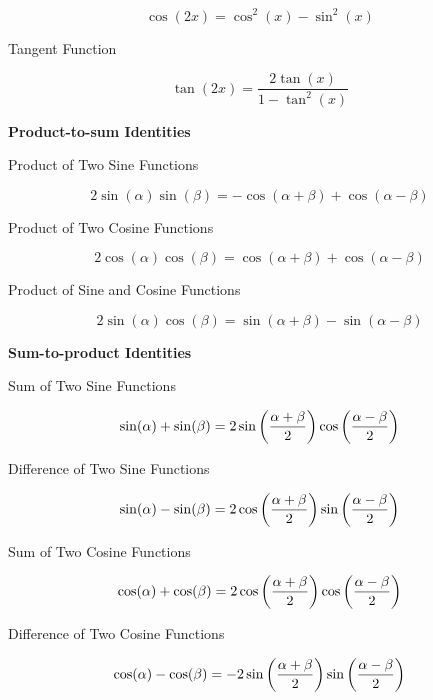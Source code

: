\documentclass[a4paper,12pt]{article}
\begin{document}
\begin{pst}
\begin{alist}
\begin{rlist}
      $$\cos(2x)=\cos^{2}(x)-\sin^{2}(x)$$

      \item Tangent Function

      $$\tan(2x)=\frac{2\tan(x)}{1-\tan^{2}(x)}$$
    \end{rlist}

    \item \textbf{Product-to-sum Identities}

    \begin{rlist}
      \item Product of Two Sine Functions

      $$2\sin(\alpha)\sin(\beta)=-\cos(\alpha+\beta)+\cos(\alpha-\beta)$$

      \item Product of Two Cosine Functions

      $$2\cos(\alpha)\cos(\beta)=\cos(\alpha+\beta)+\cos(\alpha-\beta)$$

      \item Product of Sine and Cosine Functions

      $$2\sin(\alpha)\cos(\beta)=\sin(\alpha+\beta)-\sin(\alpha-\beta)$$
    \end{rlist}

    \item \textbf{Sum-to-product Identities}

    \begin{rlist}
      \item Sum of Two Sine Functions

      $$\sin(\alpha)+\sin(\beta)=2\sin\left( \frac{\alpha+\beta}{2}\right)\cos\left( \frac{\alpha-\beta}{2}\right)$$

      \item Difference of Two Sine Functions

      $$\sin(\alpha)-\sin(\beta)=2\cos\left( \frac{\alpha+\beta}{2}\right)\sin\left( \frac{\alpha-\beta}{2}\right)$$

      \item Sum of Two Cosine Functions

      $$\cos(\alpha)+\cos(\beta)=2\cos\left( \frac{\alpha+\beta}{2}\right)\cos\left( \frac{\alpha-\beta}{2}\right)$$

      \item Difference of Two Cosine Functions

      $$\cos(\alpha)-\cos(\beta)=-2\sin\left( \frac{\alpha+\beta}{2}\right)\sin\left( \frac{\alpha-\beta}{2}\right)$$
    \end{rlist}
  \end{alist}
\end{pst}
\end{document}
